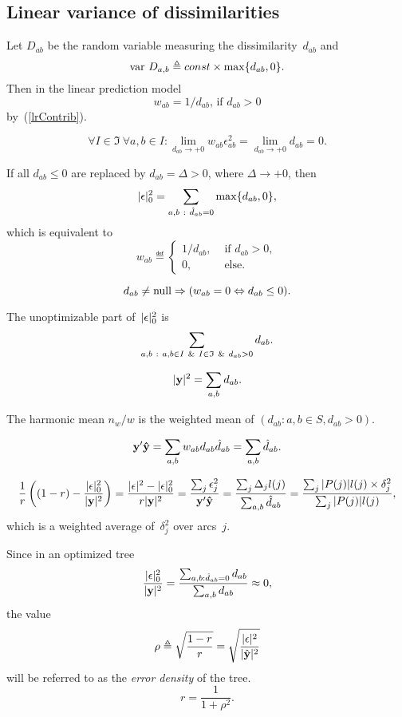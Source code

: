 \documentclass[10pt,a4paper]{article}
\theoremstyle{plain} \newtheorem{Lem}{Lemma}
\begin{document}
\subsection{Linear variance of dissimilarities}

Let $D_{ab}$ be the random variable measuring the dissimilarity~$d_{ab}$ and
\begin{equation} \label{distVar}
\mathrm {var} \  D_{a,b} \triangleq const \times \max \{d_{ab}, 0 \}.
\end{equation}
Then in the linear prediction model 
$$w_{ab} = 1/d_{ab} \text {, if } d_{ab} > 0$$ 
by~(\ref{lrContrib}).

$$ \forall I \in \mathfrak I \ \forall a,b \in I: \lim_{d_{ab} \to +0} w_{ab} \epsilon^2_{ab} = \lim_{d_{ab} \to +0} d_{ab} = 0. $$

If all $d_{ab} \le 0$ are replaced by $d_{ab} = \Delta > 0$, where $\Delta \to +0$, 
then
$$ |\ve \epsilon|^2_0 = \sum_{a,b \ : \ \hat d_{ab}=0} \max\{d_{ab}, 0\}, $$
which is equivalent to 
\begin{equation} \label{distWeight}
w_{ab} \eqdef
\begin{cases} 
1/d_{ab}, &\text{ if } d_{ab} > 0, \\
0, &\text{ else}.
\end{cases}
\end{equation}

\begin{equation} \label{zeroWeight}
d_{ab} \ne \mathrm {null} \Rightarrow (w_{ab} = 0 \Leftrightarrow d_{ab} \le 0). 
\end{equation}

The unoptimizable part of~$|\mathbf \epsilon|^2_0$ is
$$ \sum_{a,b \ : \ a,b \in I \And I \in \mathfrak I \And d_{ab} > 0} d_{ab}. $$ 

$$ |\mathbf y|^2 = \sum_{a,b} d_{ab}. $$

The harmonic mean $n_w/w$ is the weighted mean of $(d_{ab} : a,b \in S, d_{ab} > 0)$.

$$ \mathbf y' \mathbf {\hat y} = \sum_{a,b} w_{ab} d_{ab} \hat d_{ab} = \sum_{a,b} \hat d_{ab}. $$ 

$$ \frac 1 r \left( (1-r) - \frac {|\mathbf \epsilon|^2_0} {|\mathbf y|^2} \right) 
= \frac {|\mathbf \epsilon|^2 - |\mathbf \epsilon|^2_0} {r |\mathbf y|^2} 
= \frac {\sum_j \epsilon^2_j} {\mathbf y' \mathbf {\hat y}}
= \frac {\sum_j \Delta_j l(j)} {\sum_{a,b} \hat d_{ab}} 
= \frac {\sum_j |P(j)| l(j) \times \delta^2_j} {\sum_j |P(j)| l(j)}, 
$$
which is a weighted average of~$\delta^2_j$ over arcs~$j$.

Since in an optimized tree
$$ \frac {|\mathbf \epsilon|^2_0} {|\mathbf y|^2} = \frac {\sum_{a,b:\hat d_{ab}=0} d_{ab}} {\sum_{a,b} d_{ab}} \approx 0, $$
the value
$$ \rho \triangleq \sqrt{\frac {1-r} r} = \sqrt {\frac {|\mathbf \epsilon|^2} {|\hat {\mathbf y}|^2}} $$ 
will be referred to as the {\em error density} of the tree.
$$ r = \frac 1 {1 + \rho^2}. $$
\end{document}
